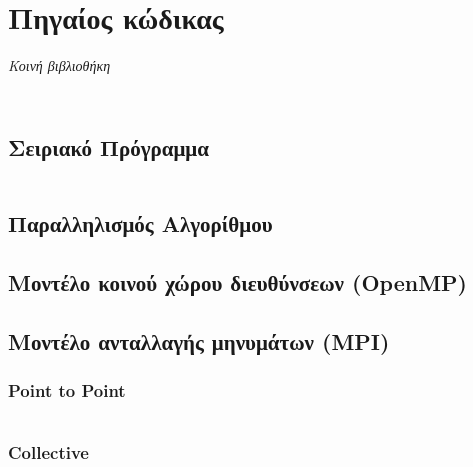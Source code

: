 \documentclass[a4paper,10pt]{article} \usepackage{anysize}
\begin{document}
\renewcommand{\theenumi}{\roman{enumi}}


\def\thesubsection {Ζητούμενο \arabic{subsection}}
\section*{Πηγαίος κώδικας}
\emph{Κοινή βιβλιοθήκη}
\inputminted[linenos,fontsize=\footnotesize,frame=leftline]{c}{files/src-lib-common.h}
\inputminted[linenos,fontsize=\footnotesize,frame=leftline]{c}{files/src-lib-common.c}
\setcounter{section}{1}
\subsection{Σειριακό Πρόγραμμα}
\inputminted[linenos,fontsize=\footnotesize,frame=leftline]{c}{files/src-serial-main.c}
\subsection{Παραλληλισμός Αλγορίθμου}
\subsection{Μοντέλο κοινού χώρου διευθύνσεων (\textbf{OpenMP})}
\subsection{Μοντέλο ανταλλαγής μηνυμάτων (\textbf{MPI})}
\subsubsection{Point to Point}
\inputminted[linenos,fontsize=\footnotesize,frame=leftline]{c}{files/src-mpi-ptp-hybrid-main.c}
\subsubsection{Collective}
\inputminted[linenos,fontsize=\footnotesize,frame=leftline]{c}{files/src-mpi-collective-hybrid-main.c}
\end{document}

